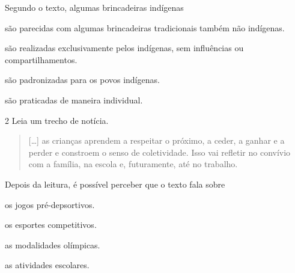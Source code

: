 \noindent{}Segundo o texto, algumas brincadeiras indígenas

\begin{escolha}
\item são parecidas com algumas brincadeiras tradicionais também não indígenas.

\item são realizadas exclusivamente pelos indígenas, sem influências ou compartilhamentos.

\item são padronizadas para os povos indígenas.

\item são praticadas de maneira individual.
\end{escolha}



\num{2} Leia um trecho de notícia.
\begin{quote}
  {[}\ldots{}{]} as crianças aprendem a respeitar o próximo, a ceder, a
  ganhar e a perder e constroem o senso de coletividade. Isso vai
  refletir no convívio com a família, na escola e, futuramente, até no
  trabalho.

\end{quote}

\noindent{}Depois da leitura, é possível perceber que o texto fala sobre

\begin{escolha}
\item os jogos pré-depsortivos.

\item os esportes competitivos.

\item as modalidades olímpicas.

\item as atividades escolares.
\end{escolha}

